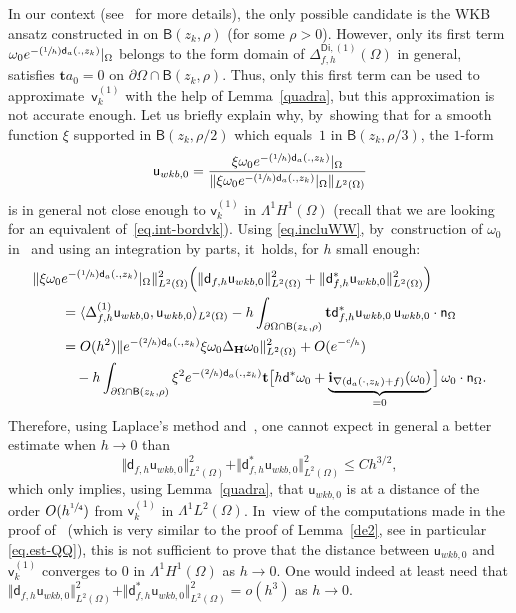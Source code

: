 \documentclass[JEP,XML,SOM,Unicode,NoEqCountersInSection,NoFloatCountersInSection,published]{cedram}
\newcommand{\Psfrac}[2]{(\sfrac{#1}{#2})}
\newcommand{\mbf}[1]{\mathbf{#1}}
\theoremstyle{plain}
\theoremstyle{definition}
\begin{document}
In our context (see~\cite[\S1.4]{DoNe2} for more details),
the only possible candidate is the WKB ansatz constructed in
\cite[\S2]{helffer-sjostrand-85}
on $\mathsf B(z_k,\rho)$ (for
some $\rho>0$).
However,
only
its first term $\omega_0e^{-\Psfrac 1h \mathsf d_a(.,z_k)}|_\Omega$
belongs to the form domain of
$\Delta_{f,h}^{\mathsf{Di},(1)}(\Omega)$ in general, \ie satisfies $\mbf t
a_0=0$ on $\partial \Omega\cap \mathsf B(z_k,\rho)$. Thus, only this first term
can be used
to approximate~$\mathsf v_k^{(1)} $ with the help of Lemma~\ref{quadra}, but this approximation
is not accurate enough.
Let us briefly explain why, by~showing that
for a smooth function
$\xi $
supported in $\mathsf B(z_k,\rho/2)$ which equals~$1$ in $\mathsf
B(z_k,\rho/3)$, the $1$-form
\[
\mathsf u_{{wkb,0}}= \frac{\xi \omega_0e^{-\Psfrac 1h \mathsf d_a(.,z_k)}|_\Omega}{\Vert \xi \omega_0e^{-\Psfrac 1h \mathsf d_a(.,z_k)}|_\Omega\Vert_{L^{2}(\Omega)}}
\]
is in general not close enough to $\mathsf v_k^{(1)} $ in $\Lambda^1H^1(\Omega)$ (recall that we are looking for an equivalent of~\eqref{eq.int-bordvk}).
Using \eqref{eq.incluWW}, by~construction of $\omega_0$ in~\cite[Th.\,2.5]{helffer-sjostrand-85} and using an integration by parts, it~holds, for $h$ small enough:
\begin{align*}
\Vert \xi \omega_0&e^{-\Psfrac 1h \mathsf d_a(.,z_k)}|_\Omega\Vert^{2}_{L^{2}(\Omega)}\Bigl(\Vert \mathsf d_{f,h}\mathsf u_{{wkb,0}}\Vert^2_{L^2(\Omega)}+\Vert \mathsf d^*_{f,h}\mathsf u_{{wkb,0}}\Vert^2_{L^2(\Omega)}\Bigr)\\
& = \langle \Delta^{(1)}_{f,h}\mathsf u_{{wkb,0}},\mathsf u_{{wkb,0}}\rangle_{L^2(\Omega)}- h\int_{\partial \Omega\cap \mathsf B(z_k,\rho)} \mbf t \mathsf d_{f,h}^* \mathsf u_{{wkb,0}}\, \mathsf u_{{wkb,0}}\cdot \mathsf n_\Omega\\
&=O(h^2) \Vert e^{-\Psfrac 2h \mathsf d_a(.,z_k)} \xi \omega_0\Delta_{\mbf H}\omega_0 \Vert^2_{L^2(\Omega)} +O(e^{-\sfrac ch})\\
&\quad -h\int_{\partial \Omega\cap \mathsf B(z_k,\rho)} \xi^2 e^{-\Psfrac 2h \mathsf d_a(.,z_k)} \mbf t \big[h\mathsf d^*\omega_0+\underbrace{\mbf i_{ \nabla(\mathsf d_a(\cdot,z_k)+f)}(\omega_0)}_{=0} \big] \, \omega_0\cdot \mathsf n_\Omega.
\end{align*}
Therefore, using Laplace's method and~\cite[Th.\,2.5]{helffer-sjostrand-85}, one cannot expect in general a better estimate
when $h\to0$ than
\[
\Vert \mathsf d_{f,h}\mathsf u_{{wkb,0}}\Vert^2_{L^2(\Omega)}+\Vert \mathsf d^*_{f,h}\mathsf u_{{wkb,0}}\Vert^2_{L^2(\Omega)}\le Ch^{3/2},
\]
which only implies, using Lemma~\ref{quadra}, that $\mathsf u_{{wkb,0}}$ is at a distance of the order $O(h^{\sfrac14})$
from $ \mathsf v_k^{(1)}
$ in $\Lambda^1L^2(\Omega)$. In~view of the computations made in the proof of~\cite[Prop.\,90]{DLLN} (which is very similar to the proof of
Lemma~\ref{de2}, see in particular \eqref{eq.est-QQ}),
this is not sufficient to prove that the distance between
$\mathsf u_{{wkb,0}}$ and $ \mathsf v_k^{(1)}$ converges to $0$
in $\Lambda^1H^1(\Omega)$ as $h\to 0$.
One would indeed
at least need that $ \Vert
\mathsf d_{f,h}\mathsf u_{{wkb,0}}\Vert^2_{L^2(\Omega)}+\Vert
\mathsf d^*_{f,h}\mathsf u_{{wkb,0}}\Vert^2_{L^2(\Omega)}=o(h^{3})$ as
$h\to 0$.
\end{document}
